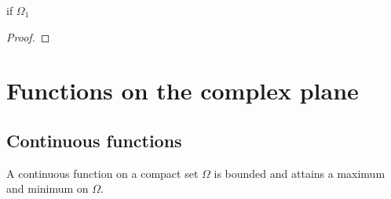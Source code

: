 \begin{proposition}
    if $\Omega_1$
\end{proposition}
\begin{proof}
\end{proof}

\section{Functions on the complex plane}

\subsection{Continuous functions}

\begin{theorem}
    A continuous function on a compact set $\Omega$ is bounded and attains
    a maximum and minimum on $\Omega$.
\end{theorem}
